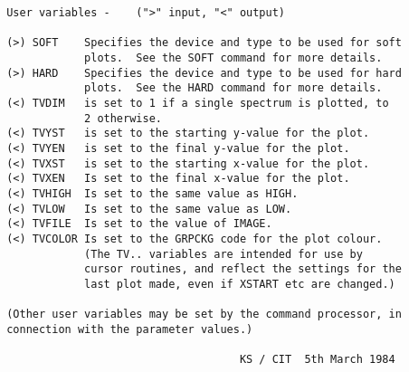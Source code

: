 \begin{description}
\begin{verbatim}
 User variables -    (">" input, "<" output)

 (>) SOFT    Specifies the device and type to be used for soft
             plots.  See the SOFT command for more details.
 (>) HARD    Specifies the device and type to be used for hard
             plots.  See the HARD command for more details.
 (<) TVDIM   is set to 1 if a single spectrum is plotted, to
             2 otherwise.
 (<) TVYST   is set to the starting y-value for the plot.
 (<) TVYEN   is set to the final y-value for the plot.
 (<) TVXST   is set to the starting x-value for the plot.
 (<) TVXEN   Is set to the final x-value for the plot.
 (<) TVHIGH  Is set to the same value as HIGH.
 (<) TVLOW   Is set to the same value as LOW.
 (<) TVFILE  Is set to the value of IMAGE.
 (<) TVCOLOR Is set to the GRPCKG code for the plot colour.
             (The TV.. variables are intended for use by
             cursor routines, and reflect the settings for the
             last plot made, even if XSTART etc are changed.)

 (Other user variables may be set by the command processor, in
 connection with the parameter values.)

                                     KS / CIT  5th March 1984
\end{verbatim}
\end{description}
